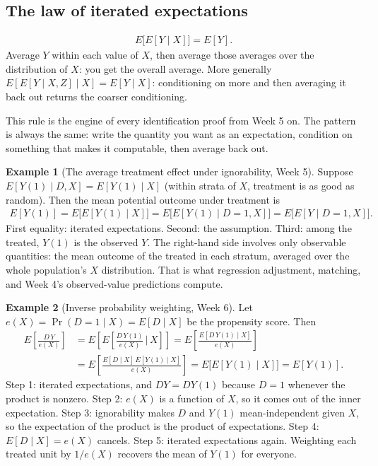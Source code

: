 \documentclass[11pt]{article}
\theoremstyle{definition}
\newtheorem{example}{Example}[section]
\newcommand{\E}{E}
\begin{document}
\subsection{The law of iterated expectations}

\begin{rulebox}
\begin{align*}
  \E\big[\E[Y \mid X]\big] = \E[Y].
\end{align*}
Average $Y$ within each value of $X$, then average those averages over the
distribution of $X$: you get the overall average. More generally
$\E[\E[Y \mid X, Z] \mid X] = \E[Y \mid X]$: conditioning on more and then
averaging it back out returns the coarser conditioning.
\end{rulebox}

This rule is the engine of every identification proof from Week 5 on.
The pattern is always the same: write the quantity you want as an
expectation, condition on something that makes it computable, then average
back out.

\begin{example}[The average treatment effect under ignorability, Week 5]
Suppose $\E[Y(1) \mid D, X] = \E[Y(1) \mid X]$ (within strata of $X$,
treatment is as good as random). Then the mean potential outcome under
treatment is
\begin{align*}
  \E[Y(1)] = \E\big[\E[Y(1) \mid X]\big] = \E\big[\E[Y(1) \mid D = 1, X]\big]
  = \E\big[\E[Y \mid D = 1, X]\big].
\end{align*}
First equality: iterated expectations. Second: the assumption. Third: among
the treated, $Y(1)$ is the observed $Y$. The right-hand side involves only
observable quantities: the mean outcome of the treated in each stratum,
averaged over the whole population's $X$ distribution. That is what
regression adjustment, matching, and Week 4's observed-value predictions
compute.
\end{example}

\begin{example}[Inverse probability weighting, Week 6]
Let $e(X) = \Pr(D = 1 \mid X) = \E[D \mid X]$ be the propensity score.
Then
\begin{align*}
  \E\!\left[\frac{D\,Y}{e(X)}\right]
  &= \E\!\left[\E\!\left[\frac{D\,Y(1)}{e(X)} \,\Big|\, X\right]\right]
  = \E\!\left[\frac{\E[D\,Y(1) \mid X]}{e(X)}\right] \\
  &= \E\!\left[\frac{\E[D \mid X]\,\E[Y(1) \mid X]}{e(X)}\right]
  = \E\big[\E[Y(1) \mid X]\big] = \E[Y(1)].
\end{align*}
Step 1: iterated expectations, and $DY = DY(1)$ because $D = 1$ whenever
the product is nonzero. Step 2: $e(X)$ is a function of $X$, so it comes
out of the inner expectation. Step 3: ignorability makes $D$ and $Y(1)$
mean-independent given $X$, so the expectation of the product is the
product of expectations. Step 4: $\E[D \mid X] = e(X)$ cancels. Step 5:
iterated expectations again. Weighting each treated unit by $1/e(X)$
recovers the mean of $Y(1)$ for everyone.
\end{example}
\end{document}
